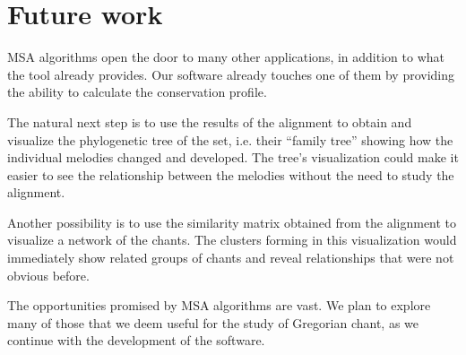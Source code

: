 \section*{Future work}

MSA algorithms open the door to many other applications, in addition to what the tool already provides. Our software already touches one
of them by providing the ability to calculate the conservation profile.

The natural next step is to use the results of the alignment to obtain and visualize the phylogenetic tree of the set, i.e. their
``family tree'' showing how the individual melodies changed and developed. The tree's visualization could make it easier to see
the relationship between the melodies without the need to study the alignment.

Another possibility is to use the similarity matrix obtained from the alignment to visualize a network of the chants. The clusters
forming in this visualization would immediately show related groups of chants and reveal relationships that were not obvious before.

The opportunities promised by MSA algorithms are vast. We plan to explore many of those that we deem useful for the study of Gregorian
chant, as we continue with the development of the software.
